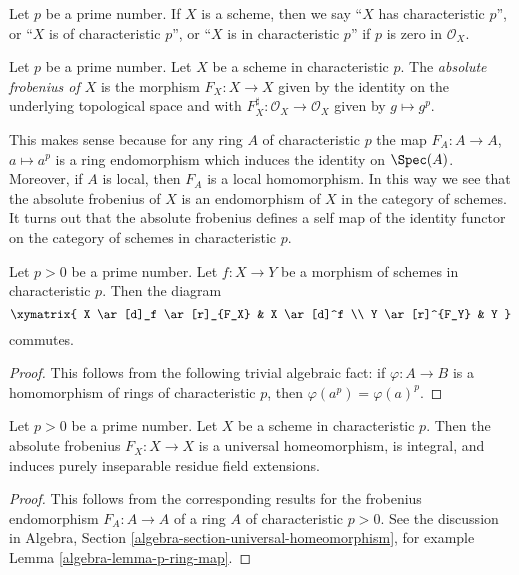 \noindent
Let $p$ be a prime number. If $X$ is a scheme, then we say
``$X$ has characteristic $p$'', or ``$X$ is of characteristic $p$'',
or ``$X$ is in characteristic $p$'' if $p$ is zero in $\mathcal{O}_X$.

\begin{definition}
\label{definition-absolute-frobenius}
Let $p$ be a prime number. Let $X$ be a scheme in characteristic $p$.
The {\it absolute frobenius of $X$} is the morphism $F_X : X \to X$
given by the identity on the underlying topological space and
with $F_X^\sharp : \mathcal{O}_X \to \mathcal{O}_X$ given by $g \mapsto g^p$.
\end{definition}

\noindent
This makes sense because for any ring $A$ of characteristic $p$
the map $F_A : A \to A$, $a \mapsto a^p$ is a ring endomorphism
which induces the identity on $\Spec(A)$. Moreover, if $A$ is
local, then $F_A$ is a local homomorphism. In this way we see that
the absolute frobenius of $X$ is an endomorphism of $X$
in the category of schemes. It turns out that the absolute frobenius
defines a self map of the identity functor on the category
of schemes in characteristic $p$.

\begin{lemma}
\label{lemma-frobenius-endomorphism-identity}
Let $p > 0$ be a prime number.
Let $f : X \to Y$ be a morphism of schemes in characteristic $p$.
Then the diagram
$$
\xymatrix{
X \ar[d]_f \ar[r]_{F_X} & X \ar[d]^f \\
Y \ar[r]^{F_Y} & Y
}
$$
commutes.
\end{lemma}

\begin{proof}
This follows from the following trivial algebraic fact: if $\varphi : A \to B$
is a homomorphism of rings of characteristic $p$, then
$\varphi(a^p) = \varphi(a)^p$.
\end{proof}

\begin{lemma}
\label{lemma-frobenius}
Let $p > 0$ be a prime number. Let $X$ be a scheme in characteristic $p$.
Then the absolute frobenius $F_X : X \to X$
is a universal homeomorphism, is integral, and
induces purely inseparable residue field extensions.
\end{lemma}

\begin{proof}
This follows from the corresponding results for the frobenius endomorphism
$F_A : A \to A$ of a ring $A$ of characteristic $p > 0$. See the
discussion in Algebra, Section \ref{algebra-section-universal-homeomorphism},
for example Lemma \ref{algebra-lemma-p-ring-map}.
\end{proof}

